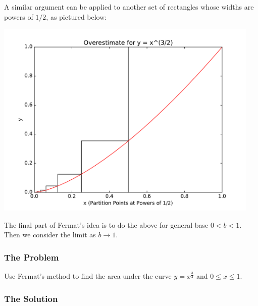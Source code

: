 A similar argument can be applied to another set of rectangles whose widths are powers of \(1/2\), as pictured below:

\includegraphics[width = 5in]{oneVarIntCalc/fermatUpper.pdf}

The final part of Fermat's idea is to do the above for general base \(0 < b < 1\). Then we consider the limit as \(b \to 1\).

\subsubsection*{The Problem}

Use Fermat's method to find the area under the curve \(y = x^{\frac{3}{2}}\) and \(0 \leq x \leq 1\).

\subsubsection*{The Solution}

